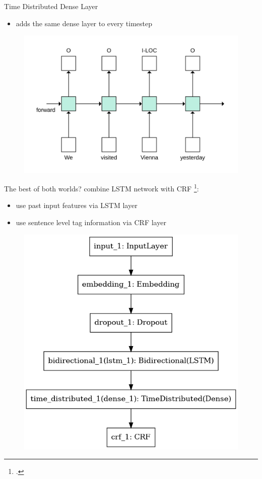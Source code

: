 \documentclass[12pt, tikz]{beamer}
\begin{document}
\begin{frame}[fragile]{Time Distributed Dense Layer}
	\begin{itemize}
		\item adds the same dense layer to every timestep 
	\end{itemize}
	\pause
	\begin{figure}
		\includegraphics[width=\linewidth]{img/lstm_overview.png}
	\end{figure}
\end{frame}

\begin{frame}[fragile]{The best of both worlds?}
	combine LSTM network with CRF  \footcite{huang2015bidirectional}:
	\begin{itemize}
		\item<1-> use past input features via LSTM layer
		\item<2-> use sentence level tag information via CRF layer
	\end{itemize}

	\vspace{-0.2cm}
	\centering
	\begin{figure}
		\includegraphics[width=0.5\linewidth]{img/lstm_crf_model.png}
	\end{figure}
\end{frame}
\end{document}
